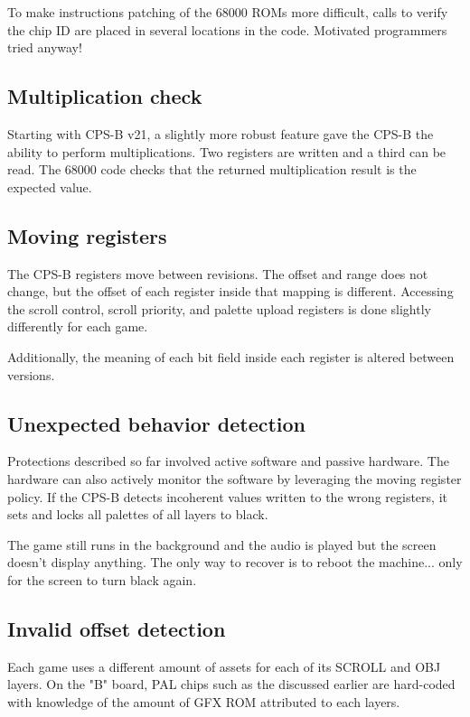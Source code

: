 To make instructions patching of the 68000 ROMs more difficult, calls to verify the chip ID are placed in several locations in the code. Motivated programmers tried anyway\cite{strider_conversion}!

\subsection{Multiplication check}
Starting with CPS-B v21, a slightly more robust feature gave the CPS-B the ability to perform multiplications. Two registers are written and a third can be read. The 68000 code checks that the returned multiplication result is the expected value.

\subsection{Moving registers}
The CPS-B registers move between revisions. The offset and range does not change, but the offset of each register inside that mapping is different. Accessing the scroll control, scroll priority, and palette upload registers is done slightly differently for each game.

Additionally, the meaning of each bit field inside each register is altered between versions.



\subsection{Unexpected behavior detection}
Protections described so far involved active software and passive hardware. The hardware can also actively monitor the software by leveraging the moving register policy. If the CPS-B detects incoherent values written to the wrong registers, it sets and locks all palettes of all layers to black. 

The game still runs in the background and the audio is played but the screen doesn't display anything. The only way to recover is to reboot the machine\cite{petitSecurity}... only for the screen to turn black again.






\subsection{Invalid offset detection}

Each game uses a different amount of assets for each of its SCROLL and OBJ layers. On the "B" board, PAL chips such as the  discussed earlier are hard-coded with knowledge of the amount of GFX ROM attributed to each layers.

